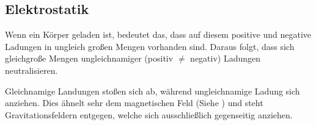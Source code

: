 




%
%	





\subsection{Elektrostatik}

Wenn ein Körper geladen ist, bedeutet das, dass auf diesem positive und negative Ladungen in ungleich großen Mengen vorhanden sind. Daraus folgt, dass sich gleichgroße Mengen ungleichnamiger (positiv $\neq$ negativ) Ladungen neutralisieren.

Gleichnamige Landungen stoßen sich ab, während ungleichnamige Ladung sich anziehen. Dies ähnelt sehr dem magnetischen Feld (Siehe ) und steht Gravitationsfeldern entgegen, welche sich ausschließlich gegenseitig anziehen.

